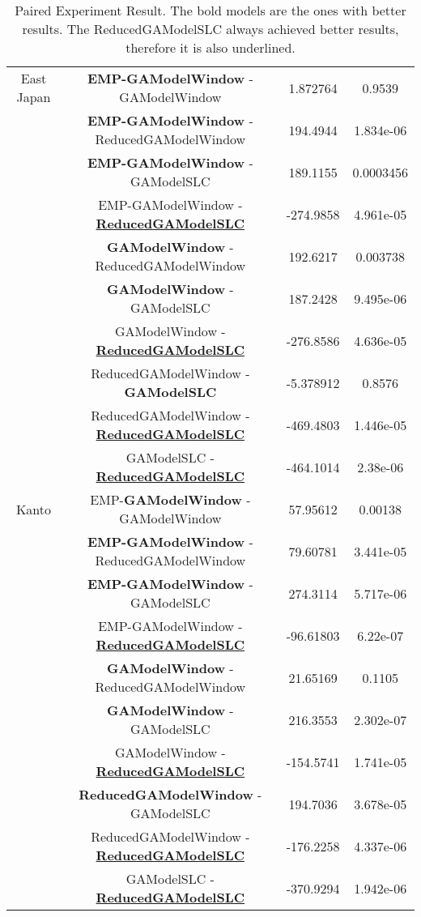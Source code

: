\begin{table*}[]
\begin{center}
\begin{tabular}{|c|c|c|c|}
			
			\hline
			East Japan & \textbf{EMP-GAModelWindow} - GAModelWindow &
			1.872764  & 0.9539\\

			& \textbf{EMP-GAModelWindow} - ReducedGAModelWindow &
			194.4944 & 1.834e-06\\
			& \textbf{EMP-GAModelWindow} - GAModelSLC &
			189.1155 & 0.0003456\\
			& EMP-GAModelWindow - \underline{\textbf{ReducedGAModelSLC}} &
			-274.9858 & 4.961e-05\\
			& \textbf{GAModelWindow} - ReducedGAModelWindow &
			192.6217 & 0.003738\\
			& \textbf{GAModelWindow} - GAModelSLC &
			187.2428 &9.495e-06\\
			& GAModelWindow - \underline{\textbf{ReducedGAModelSLC}} &
			-276.8586 & 4.636e-05\\
			& ReducedGAModelWindow - \textbf{GAModelSLC} & 
			-5.378912 & 0.8576\\
			& ReducedGAModelWindow - \underline{\textbf{ReducedGAModelSLC}} &
			-469.4803 & 1.446e-05\\
			& GAModelSLC - \underline{\textbf{ReducedGAModelSLC}} &
			-464.1014  & 2.38e-06\\

			
			\hline
			Kanto & EMP-\textbf{GAModelWindow} - GAModelWindow &
			57.95612 & 0.00138\\
			& \textbf{EMP-GAModelWindow} - ReducedGAModelWindow &
			79.60781 & 3.441e-05\\
			& \textbf{EMP-GAModelWindow} - GAModelSLC &
			274.3114  & 5.717e-06\\
			& EMP-GAModelWindow - \underline{\textbf{ReducedGAModelSLC}} & 
			-96.61803  & 6.22e-07\\
			& \textbf{GAModelWindow} - ReducedGAModelWindow & 
			21.65169  & 0.1105\\
			&\textbf{GAModelWindow} - GAModelSLC &
			216.3553  & 2.302e-07\\
			& GAModelWindow - \underline{\textbf{ReducedGAModelSLC}} &
			-154.5741  & 1.741e-05\\
			& \textbf{ReducedGAModelWindow} - GAModelSLC &
			194.7036  & 3.678e-05\\
			& ReducedGAModelWindow -\underline{\textbf{ReducedGAModelSLC}} &
			-176.2258 & 4.337e-06\\
			& GAModelSLC - \underline{\textbf{ReducedGAModelSLC}} &
			-370.9294 &1.942e-06\\
			\hline
		\end{tabular}
	\end{center}
	\caption{Paired Experiment Result. The bold models are the ones with better results. The ReducedGAModelSLC always achieved better results, therefore it is also underlined.}
	\label{Paired}
\end{table*}



